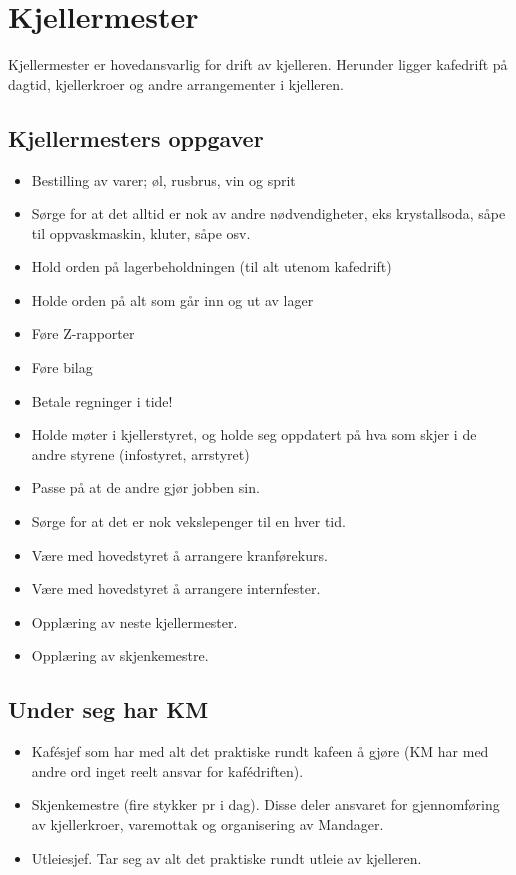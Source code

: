 \section{Kjellermester}

Kjellermester er hovedansvarlig for drift av kjelleren. Herunder ligger kafedrift på dagtid, kjellerkroer og andre arrangementer i kjelleren. 

\subsection{Kjellermesters oppgaver}
\begin{itemize}
\item Bestilling av varer; øl, rusbrus, vin og sprit
\item Sørge for at det alltid er nok av andre nødvendigheter,
      eks krystallsoda, såpe til oppvaskmaskin, kluter, såpe osv.
\item Hold orden på lagerbeholdningen (til alt utenom kafedrift)
\item Holde orden på alt som går inn og ut av lager
\item Føre Z-rapporter
\item Føre bilag
\item Betale regninger i tide!
\item Holde møter i kjellerstyret, og holde seg oppdatert på
      hva som skjer i de andre styrene (infostyret, arrstyret)
\item Passe på at de andre gjør jobben sin.
\item Sørge for at det er nok vekslepenger til en hver tid.
\item Være med hovedstyret å arrangere kranførekurs.
\item Være med hovedstyret å arrangere internfester.
\item Opplæring av neste kjellermester.
\item Opplæring av skjenkemestre.
\end{itemize}

\subsection{Under seg har KM}
\begin{itemize}
\item Kaf\'esjef som har med alt det praktiske rundt kafeen å gjøre
      (KM har med andre ord inget reelt ansvar for kaf\'edriften).
\item Skjenkemestre (fire stykker pr i dag). Disse deler ansvaret
      for gjennomføring av kjellerkroer, varemottak og organisering
      av Mandager.
\item Utleiesjef. Tar seg av alt det praktiske rundt utleie av kjelleren.
\end{itemize}

